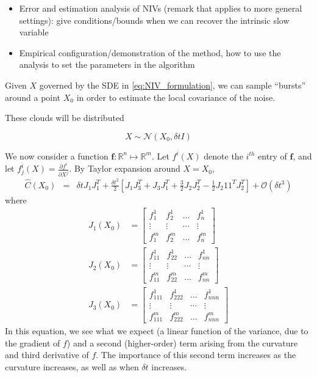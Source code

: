 \documentclass[1p]{elsarticle}
\begin{document}
\begin{itemize}
\item Error and estimation analysis of NIVs (remark that applies to more general settings): give conditions/bounds when we can recover the intrinsic slow variable
%
\item Empirical configuration/demonstration of the method, how to use the analysis to set the parameters in the algorithm
\end{itemize}

Given $X$ governed by the SDE in \eqref{eq:NIV_formulation}, we can sample ``bursts'' around a point $X_0$ in order to estimate the local covariance of the noise. 

These clouds will be distributed 

\begin{equation}
X \sim \mathcal{N}\left( X_0, \delta t I \right)
\end{equation}


We now consider a function $\mathbf{f}: \mathbb{R}^n \mapsto \mathbb{R}^m$.
%
Let $f^i(X)$ denote the $i^{th}$ entry of $\mathbf{f}$, and let $f^i_j(X) = \frac{\partial f^i}{\partial X^j}$.
%
By Taylor expansion around $X=X_0$,
%
\begin{eqnarray}
\hat{C}(X_0) &=& \delta t J_1 J_1^T 
+ \frac{\delta t^2}{2} \left[ J_1 J_3^T + J_3 J_1^T  
+ \frac{3}{2} J_2 J_2^T 
-\frac{1 }{2} J_2 1 1^T J_2^T \right]
+ \mathcal{O} (\delta t^3) %
\end{eqnarray}
where
\begin{equation}
\begin{aligned}
J_1(X_0) &= \begin{bmatrix}
f_1^1 & f_2^1 & \dots & f_n^1 \\
\vdots & \vdots & \cdots & \vdots \\
f_1^m & f_2^m & \dots & f_n^m
\end{bmatrix}\\
%
J_2(X_0) &= \begin{bmatrix}
f_{11}^1 & f_{22}^1 & \dots & f_{nn}^1 \\
\vdots & \vdots & \cdots & \vdots \\
f_{11}^m & f_{22}^m & \dots & f_{nn}^m
\end{bmatrix}\\
%
J_3(X_0) &= \begin{bmatrix}
f_{111}^1 & f_{222}^1 & \dots & f_{nnn}^1 \\
\vdots & \vdots & \cdots & \vdots \\
f_{111}^m & f_{222}^m & \dots & f_{nnn}^m
\end{bmatrix}
\end{aligned}
\end{equation}
%
In this equation, we see what we expect (a linear function of the variance, due to the gradient of $f$) and a second (higher-order) term arising from the curvature and third derivative of $f$.
%
The importance of this second term increases as the curvature increases, as well as when $\delta t$ increases. 
\end{document}
